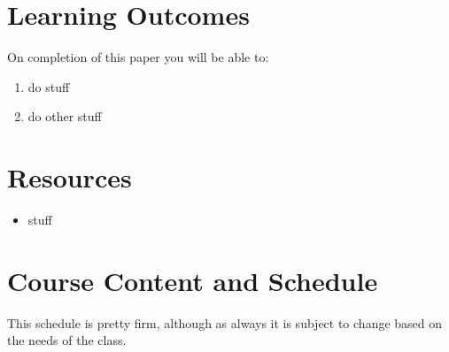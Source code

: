 \documentclass{article}
\begin{document}
\section*{Learning Outcomes}
On completion of this paper you will be able to:
\begin{enumerate}
  \item do stuff 
  \item do other stuff
\end{enumerate}

\section*{Resources}
\begin{itemize}
 \item stuff
\end{itemize}


\section*{Course Content and Schedule}
This schedule is pretty firm, although as always it is subject to change based on the needs of the class.
\end{document}
